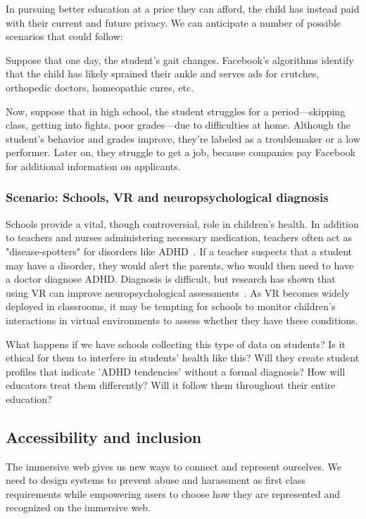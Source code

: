 In pursuing better education at a price they can afford, the child has instead paid with their current and future privacy. We can anticipate a number of possible scenarios that could follow:

Suppose that one day, the student's gait changes. Facebook's algorithms identify that the child has likely sprained their ankle and serves ads for crutches, orthopedic doctors, homeopathic cures, etc.

Now, suppose that in high school, the student struggles for a period---skipping class, getting into fights, poor grades---due to difficulties at home. Although the student's behavior and grades improve, they're labeled as a troublemaker or a low performer. Later on, they struggle to get a job, because companies pay Facebook for additional information on applicants.

\subsubsection{Scenario: Schools, VR and neuropsychological diagnosis}

Schools provide a vital, though controversial, role in children's health. In addition to teachers and nurses administering necessary medication, teachers often act as "disease-spotters" for disorders like ADHD~\cite{phillips2006medicine}. If a teacher suspects that a student may have a disorder, they would alert the parents, who would then need to have a doctor diagnose ADHD. Diagnosis is difficult, but research has shown that using VR can improve neuropsychological assessments~\cite{areces2018analysis}. As VR becomes widely deployed in classrooms, it may be tempting for schools to monitor children's interactions in virtual environments to assess whether they have these conditions.

What happens if we have schools collecting this type of data on students? Is it ethical for them to interfere in students' health like this? Will they create student profiles that indicate 'ADHD tendencies' without a formal diagnosis? How will educators treat them differently? Will it follow them throughout their entire education?

\subsection{Accessibility and inclusion}

The immersive web gives us new ways to connect and represent ourselves. We need to design systems to prevent abuse and harassment as first class requirements while empowering users to choose how they are represented and recognized on the immersive web.

